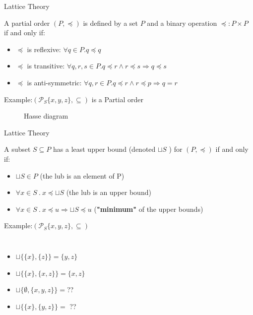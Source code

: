 \begin{frame}{Lattice Theory}
\begin{definition}
	A partial order  $(P,\preceq)$ is defined by a set $P$ and a binary operation $\preceq: P \times P$  if and only if:
	\begin{itemize} 
		\item $\preceq$ is reflexive: $\forall q \in P. q \preceq q$
		\item $\preceq$ is transitive: $\forall q, r, s \in P. q \preceq r \wedge r \preceq s \Rightarrow q \preceq s$
		\item $\preceq$ is anti-symmetric: $\forall q, r \in P. q \preceq r \wedge r \preceq p \Rightarrow q = r$
    \end{itemize}
\end{definition}
\begin{exampleblock}{Example:$(\mathcal{P}_S\{x,y,z\}, \subseteq)$ is a Partial order}
	\begin{figure}
	\centering 
	\caption{Hasse diagram}
	\end{figure}
\end{exampleblock}
\end{frame}
\begin{frame}{Lattice Theory}
\begin{definition}
	A subset $S \subseteq P$ has a least upper bound (denoted $\sqcup S$ ) for     $(P,\preceq)$ if and only if:
	\begin{itemize} 
	\item  $\sqcup S \in P$ (the lub is an element of P)
	\item $ \forall x \in S~.~ x \preceq \sqcup S$ (the lub is an upper bound)
	\item $ \forall x \in S ~.~x \preceq u \Rightarrow \sqcup S \preceq u$ (\textbf{"minimum"} of the upper bounds)
\end{itemize}
\end{definition}
\begin{exampleblock}{Example:$(\mathcal{P}_S\{x,y,z\}, \subseteq)$}
	\begin{columns}
 	
 
 \footnotesize
 \begin{itemize}
 	\item  $\sqcup\{\{x\},\{z\}\}= \{y,z\}$
 	\item  $\sqcup\{\{x\},\{x,z\}\}=\{x,z\}$
 	\item  $\sqcup\{\emptyset,\{x,y,z\}\}=$??
 	\item  $\sqcup \{\{x\},\{y,z\}\}=$ ??
 \end{itemize}
	\end{columns}
\end{exampleblock}
\end{frame}


